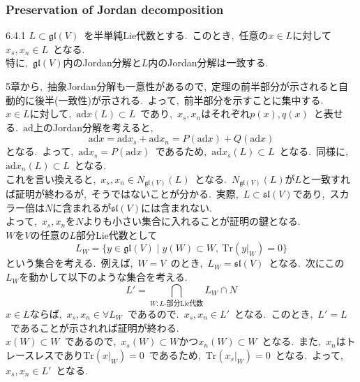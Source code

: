 \documentclass[uplatex,dvipdfmx]{jsarticle}
\begin{document}
\subsubsection{Preservation of Jordan decomposition}
\begin{mythm}{6.4.1}
    $L \subset \mathfrak{gl}(V)$~を半単純Lie代数とする.~このとき,~任意の$x\in L$に対して$x_s,x_n \in L$~となる.\\
    特に,~$\mathfrak{gl}(V)$内のJordan分解と$L$内のJordan分解は一致する.
\end{mythm}
\begin{myproof}
    5章から,~抽象Jordan分解も一意性があるので,~定理の前半部分が示されると自動的に後半(一致性)が示される.~よって,~前半部分を示すことに集中する.\\
    $x \in L$に対して,~$\text{ad}x (L) \subset L$~であり,~$x_s,x_n$はそれぞれ$p(x), q(x)$~と表せる.~$\text{ad}$上のJordan分解を考えると,
    \begin{equation*}
        \text{ad}x = \text{ad}x_s + \text{ad}x_n = P(\text{ad}x) + Q(\text{ad}x)
    \end{equation*}
    となる.~よって,~$\text{ad}x_s = P(\text{ad}x)$~であるため,~$\text{ad}x_s (L) \subset L$~となる.~同様に,~$\text{ad}x_n (L) \subset L$~となる.\\
    これを言い換えると,~$x_s,x_n \in N_{\mathfrak{gl}(V)}(L)$~となる.~$N_{\mathfrak{gl}(V)}(L)$が$L$と一致すれば証明が終わるが,~そうではないことが分かる.~実際,~$L \subset \mathfrak{sl}(V)$であり,~スカラー倍は$N$に含まれるが$\mathfrak{sl}(V)$には含まれない.\\
    よって,~$x_s,x_n$を$N$よりも小さい集合に入れることが証明の鍵となる.\\
    $W$を$V$の任意の$L$部分Lie代数として
    \begin{equation*}
        L_W = \{ y\in \mathfrak{gl}(V) \mid y(W) \subset W,~\text{Tr}(y|_W) = 0 \}
    \end{equation*}
    という集合を考える.~例えば,~$W = V$~のとき,~$L_W = \mathfrak{sl}(V)$~となる.~次にこの$L_W$を動かして以下のような集合を考える.
    \begin{equation*}
        L' = \bigcap_{W: L\text{-部分Lie代数}} L_W \cap N
    \end{equation*}
    $x\in L$ならば,~$x_s,x_n \in \forall L_W$~であるので.~$x_s,x_n \in L'$~となる.~このとき,~$L' = L$~であることが示されれば証明が終わる.\\
    $x(W) \subset W$~であるので,~$x_s(W) \subset W$かつ$x_n(W) \subset W$~となる.~また,~$x_n$はトレースレスであり$\text{Tr}(x|_W) = 0$~であるため,~$\text{Tr}(x_s|_W) = 0$~となる.~よって,~$x_s,x_n \in L'$~となる.\\

\end{myproof}
\end{document}
